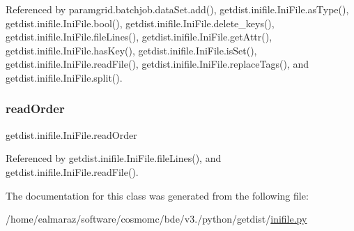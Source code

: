 Referenced by paramgrid.\+batchjob.\+data\+Set.\+add(), getdist.\+inifile.\+Ini\+File.\+as\+Type(), getdist.\+inifile.\+Ini\+File.\+bool(), getdist.\+inifile.\+Ini\+File.\+delete\+\_\+keys(), getdist.\+inifile.\+Ini\+File.\+file\+Lines(), getdist.\+inifile.\+Ini\+File.\+get\+Attr(), getdist.\+inifile.\+Ini\+File.\+has\+Key(), getdist.\+inifile.\+Ini\+File.\+is\+Set(), getdist.\+inifile.\+Ini\+File.\+read\+File(), getdist.\+inifile.\+Ini\+File.\+replace\+Tags(), and getdist.\+inifile.\+Ini\+File.\+split().

\mbox{\label{classgetdist_1_1inifile_1_1IniFile_acef36ab183335aff24a0a9d9f7cc7e05}} 
\subsubsection{\texorpdfstring{read\+Order}{readOrder}}
{\footnotesize\ttfamily getdist.\+inifile.\+Ini\+File.\+read\+Order}



Referenced by getdist.\+inifile.\+Ini\+File.\+file\+Lines(), and getdist.\+inifile.\+Ini\+File.\+read\+File().



The documentation for this class was generated from the following file\+:\begin{DoxyCompactItemize}
\item 
/home/ealmaraz/software/cosmomc/bde/v3./python/getdist/\mbox{\hyperlink{inifile_8py}{inifile.\+py}}\end{DoxyCompactItemize}
